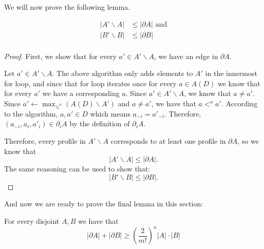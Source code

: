 	We will now prove the following lemma.
	\begin{lemma}
		\label{lemma-8-enough-edges}
		\begin{align*}
			|A' \backslash A| &\le |\partial A| \textrm{ and} \\
			|B' \backslash B| &\le |\partial B| \\
		\end{align*}
	\end{lemma}

	\begin{proof}
		First, we show that for every $a' \in A' \backslash A$, we have an edge in $\partial A$.

		Let $a' \in A' \backslash A$. The above algorithm only adds elements to $A'$ in the innermost for loop, and since that for loop iterates once for every $a \in A(D)$ we know that for every $a'$ we have a corresponding $a$. Since $a' \in A' \backslash A$, we know that $a \ne a'$. Since $a' \gets \max_{\le^n}(A(D) \backslash A')$ and $a \ne a'$, we have that $a <^n a'$. According to the algorithm, $a, a' \in D$ which means $a_{-i} = a'_{-i}$. Therefore, $(a_{-i}, a_i, a'_i) \in \partial_i A$ by the definition of $\partial_i A$.

		Therefore, every profile in $A' \backslash A$ corresponds to at least one profile in $\partial A$, so we know that
		\[
			|A' \backslash A| \le |\partial A|.
		\]
		The same reasoning can be used to show that:
		\[
			|B' \backslash B| \le |\partial B|.
		\]
	\end{proof}

	And now we are ready to prove the final lemma in this section:

	\begin{conjecture}
		\label{friedgut-lemma-8}
		For every disjoint $A, B$ we have that
		\[
			|\partial A| + |\partial B| \ge \left( \frac{2}{m!} \right)^n |A| \cdot |B|
		\]
	\end{conjecture}

